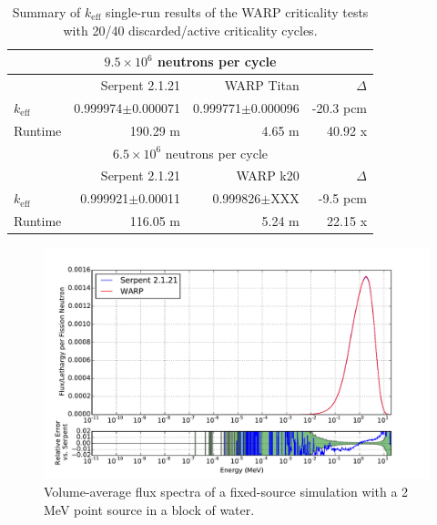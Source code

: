 \documentclass[preprint,12pt]{elsarticle}
\begin{document}
\begin{table}[h]
\centering
\caption{Summary of $k_\mathrm{eff}$ single-run results of the WARP criticality tests with 20/40 discarded/active criticality cycles.}
\label{jezebel_table}
\small
\begin{tabular}{| l | r | r | r |}
\hline
\multicolumn{4}{|c|}{$9.5\times10^6$ neutrons per cycle} \\
\hline
                  & Serpent 2.1.21        & WARP Titan                & $\Delta$ \\
\hline
$k_\mathrm{eff}$  & 0.999974$\pm$0.000071 & 0.999771$\pm$0.000096     & -20.3 pcm \\
\hline
Runtime           & 190.29 m              & 4.65 m                    & 40.92 x \\
\hline
\hline
\multicolumn{4}{|c|}{$6.5\times10^6$ neutrons per cycle} \\
\hline
                  & Serpent 2.1.21       & WARP k20            & $\Delta$ \\
\hline
$k_\mathrm{eff}$  & 0.999921$\pm$0.00011 & 0.999826$\pm$XXX    & -9.5 pcm \\
\hline
Runtime           & 116.05 m             & 5.24 m              & 22.15 x\\
\hline
\end{tabular}
\end{table}

\begin{figure}[h!]
\centering
\includegraphics[width=\textwidth,trim= 1cm 0cm 1cm 0cm]{graphics/jezebel_spec.pdf}
\caption{Volume-average flux spectra of a fixed-source simulation with a 2 MeV point source in a block of water. \label{jezebel_spec} }
\end{figure}
\end{document}
